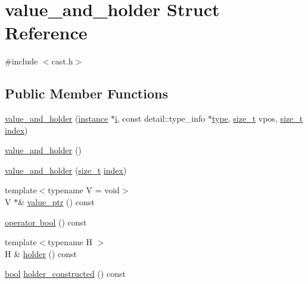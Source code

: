 \hypertarget{structvalue__and__holder}{}\section{value\+\_\+and\+\_\+holder Struct Reference}
\label{structvalue__and__holder}


{\ttfamily \#include $<$cast.\+h$>$}

\subsection*{Public Member Functions}
\begin{DoxyCompactItemize}
\item 
\mbox{\hyperlink{structvalue__and__holder_ad0979a40cdfac38efa425ac5e9d98ef3}{value\+\_\+and\+\_\+holder}} (\mbox{\hyperlink{structinstance}{instance}} $\ast$\mbox{\hyperlink{abstract_8h_a13235ab5ddf5c2ccd5ca35ab01d91328}{i}}, const detail\+::type\+\_\+info $\ast$\mbox{\hyperlink{_s_d_l__opengl_8h_ad5ddf6fca7b585646515660e810e0188}{type}}, \mbox{\hyperlink{detail_2common_8h_a801d6a451a01953ef8cbae6feb6a3638}{size\+\_\+t}} vpos, \mbox{\hyperlink{detail_2common_8h_a801d6a451a01953ef8cbae6feb6a3638}{size\+\_\+t}} \mbox{\hyperlink{_s_d_l__opengl__glext_8h_a57f14e05b1900f16a2da82ade47d0c6d}{index}})
\item 
\mbox{\hyperlink{structvalue__and__holder_a45b5891a7f3f38521afa8efaec497793}{value\+\_\+and\+\_\+holder}} ()
\item 
\mbox{\hyperlink{structvalue__and__holder_a01d2d216cf167e3c03f668e5723ce0bf}{value\+\_\+and\+\_\+holder}} (\mbox{\hyperlink{detail_2common_8h_a801d6a451a01953ef8cbae6feb6a3638}{size\+\_\+t}} \mbox{\hyperlink{_s_d_l__opengl__glext_8h_a57f14e05b1900f16a2da82ade47d0c6d}{index}})
\item 
{\footnotesize template$<$typename V  = void$>$ }\\V $\ast$\& \mbox{\hyperlink{structvalue__and__holder_af3c728355ac1f2716f409bfc3b9183b9}{value\+\_\+ptr}} () const
\item 
\mbox{\hyperlink{structvalue__and__holder_ac667c36315e12e9127e9850af824c34d}{operator bool}} () const
\item 
{\footnotesize template$<$typename H $>$ }\\H \& \mbox{\hyperlink{structvalue__and__holder_ad375bce60ea6528d046069d0fefa6d5b}{holder}} () const
\item 
\mbox{\hyperlink{asdl_8h_af6a258d8f3ee5206d682d799316314b1}{bool}} \mbox{\hyperlink{structvalue__and__holder_ad4cae8c2fae04fcc54135883a509230f}{holder\+\_\+constructed}} () const

\end{DoxyCompactItemize}
